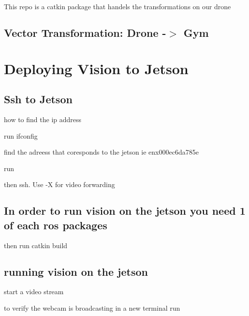 This repo is a catkin package that handels the transformations on our drone

\subsection*{Vector Transformation\+: Drone -\/$>$ Gym}



\section*{Deploying Vision to Jetson}

\subsection*{Ssh to Jetson}

how to find the ip address

run {\ttfamily ifconfig}

find the adreess that coresponds to the jetson ie enx000ec6da785e

run 
\begin{DoxyCode}{0}
\end{DoxyCode}


then ssh. Use -\/X for video forwarding 
\begin{DoxyCode}{0}
\end{DoxyCode}


\subsection*{In order to run vision on the jetson you need 1 of each ros packages}


\begin{DoxyCode}{0}
\end{DoxyCode}
 then run catkin build

\subsection*{running vision on the jetson}

start a video stream 
\begin{DoxyCode}{0}
\end{DoxyCode}
 to verify the webcam is broadcasting in a new terminal run



